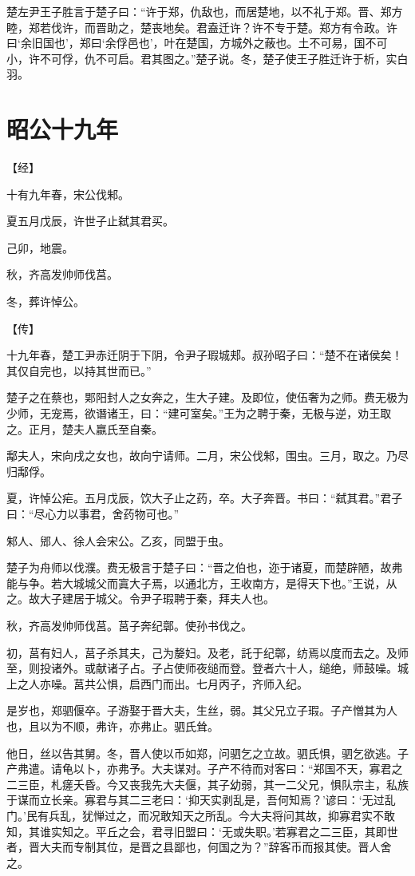\documentclass[a4paper,12pt,UTF8,twoside]{ctexbook}
\begin{document}
楚左尹王子胜言于楚子曰：“许于郑，仇敌也，而居楚地，以不礼于郑。晋、郑方睦，郑若伐许，而晋助之，楚丧地矣。君盍迁许？许不专于楚。郑方有令政。许曰‘余旧国也’，郑曰‘余俘邑也’，叶在楚国，方城外之蔽也。土不可易，国不可小，许不可俘，仇不可启。君其图之。”楚子说。冬，楚子使王子胜迁许于析，实白羽。


\chapter{昭公十九年}




【经】

十有九年春，宋公伐邾。

夏五月戊辰，许世子止弑其君买。

己卯，地震。

秋，齐高发帅师伐莒。

冬，葬许悼公。

【传】

十九年春，楚工尹赤迁阴于下阴，令尹子瑕城郏。叔孙昭子曰：“楚不在诸侯矣！其仅自完也，以持其世而已。”

楚子之在蔡也，郹阳封人之女奔之，生大子建。及即位，使伍奢为之师。费无极为少师，无宠焉，欲谮诸王，曰：“建可室矣。”王为之聘于秦，无极与逆，劝王取之。正月，楚夫人嬴氏至自秦。

鄅夫人，宋向戌之女也，故向宁请师。二月，宋公伐邾，围虫。三月，取之。乃尽归鄅俘。

夏，许悼公疟。五月戊辰，饮大子止之药，卒。大子奔晋。书曰：“弑其君。”君子曰：“尽心力以事君，舍药物可也。”

邾人、郳人、徐人会宋公。乙亥，同盟于虫。

楚子为舟师以伐濮。费无极言于楚子曰：“晋之伯也，迩于诸夏，而楚辟陋，故弗能与争。若大城城父而寘大子焉，以通北方，王收南方，是得天下也。”王说，从之。故大子建居于城父。令尹子瑕聘于秦，拜夫人也。

秋，齐高发帅师伐莒。莒子奔纪鄣。使孙书伐之。

初，莒有妇人，莒子杀其夫，己为嫠妇。及老，託于纪鄣，纺焉以度而去之。及师至，则投诸外。或献诸子占。子占使师夜缒而登。登者六十人，缒绝，师鼓噪。城上之人亦噪。莒共公惧，启西门而出。七月丙子，齐师入纪。

是岁也，郑驷偃卒。子游娶于晋大夫，生丝，弱。其父兄立子瑕。子产憎其为人也，且以为不顺，弗许，亦弗止。驷氏耸。

他日，丝以告其舅。冬，晋人使以币如郑，问驷乞之立故。驷氏惧，驷乞欲逃。子产弗遣。请龟以卜，亦弗予。大夫谋对。子产不待而对客曰：“郑国不天，寡君之二三臣，札瘥夭昏。今又丧我先大夫偃，其子幼弱，其一二父兄，惧队宗主，私族于谋而立长亲。寡君与其二三老曰：‘抑天实剥乱是，吾何知焉？’谚曰：‘无过乱门。’民有兵乱，犹惮过之，而况敢知天之所乱。今大夫将问其故，抑寡君实不敢知，其谁实知之。平丘之会，君寻旧盟曰：‘无或失职。’若寡君之二三臣，其即世者，晋大夫而专制其位，是晋之县鄙也，何国之为？”辞客币而报其使。晋人舍之。
\end{document}
